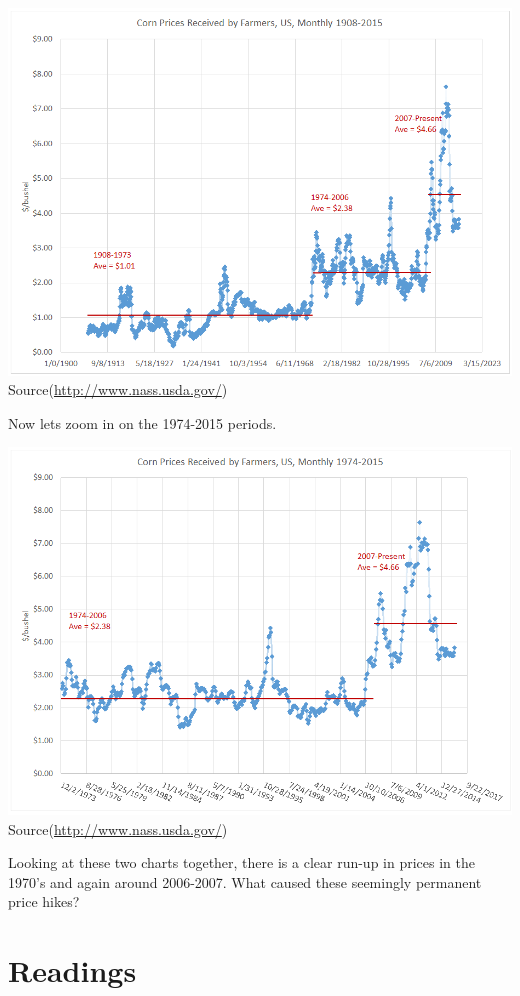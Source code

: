 \documentclass[]{book}
\theoremstyle{definition}
\theoremstyle{definition}
\theoremstyle{remark}
\begin{document}
\includegraphics{Excel-files/IntroductiontoCommodity_files/image001.png}
Source(\url{http://www.nass.usda.gov/})

Now lets zoom in on the 1974-2015 periods.

\includegraphics{Excel-files/IntroductiontoCommodity_files/image003.png}
Source(\url{http://www.nass.usda.gov/})

Looking at these two charts together, there is a clear run-up in prices
in the 1970's and again around 2006-2007. What caused these seemingly
permanent price hikes?

\section{Readings}\label{readings}
\end{document}
